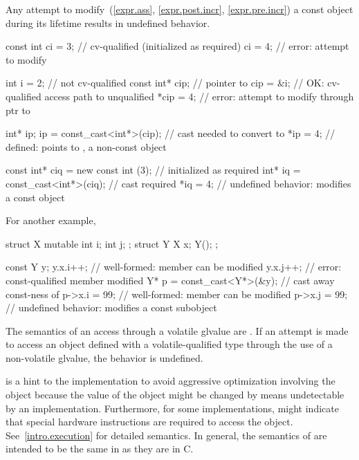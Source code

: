 \pnum
{}%
Any attempt to modify~(\ref{expr.ass},
\ref{expr.post.incr}, \ref{expr.pre.incr}) a
const object during its
lifetime results in undefined behavior.
\begin{example}
\begin{codeblock}
const int ci = 3;                       // cv-qualified (initialized as required)
ci = 4;                                 // error: attempt to modify 

int i = 2;                              // not cv-qualified
const int* cip;                         // pointer to 
cip = &i;                               // OK: cv-qualified access path to unqualified
*cip = 4;                               // error: attempt to modify through ptr to 

int* ip;
ip = const_cast<int*>(cip);             // cast needed to convert  to 
*ip = 4;                                // defined:  points to , a non-const object

const int* ciq = new const int (3);     // initialized as required
int* iq = const_cast<int*>(ciq);        // cast required
*iq = 4;                                // undefined behavior: modifies a const object
\end{codeblock}
For another example,
\begin{codeblock}
struct X {
  mutable int i;
  int j;
};
struct Y {
  X x;
  Y();
};

const Y y;
y.x.i++;                                // well-formed:  member can be modified
y.x.j++;                                // error: const-qualified member modified
Y* p = const_cast<Y*>(&y);              // cast away const-ness of 
p->x.i = 99;                            // well-formed:  member can be modified
p->x.j = 99;                            // undefined behavior: modifies a const subobject
\end{codeblock}
\end{example}

\pnum
The semantics of an access through a volatile glvalue are
.
If an attempt is made to access an object defined with a
volatile-qualified type through the use of a non-volatile glvalue,
the behavior is undefined.

\pnum
{}%
%
\begin{note}
 is a hint to the implementation to avoid aggressive
optimization involving the object because the value of the object might
be changed by means undetectable by an implementation.
Furthermore, for some implementations,  might indicate that
special hardware instructions are required to access the object.
See~\ref{intro.execution} for detailed semantics. In general, the
semantics of  are intended to be the same in \Cpp{} as
they are in C.
\end{note}

